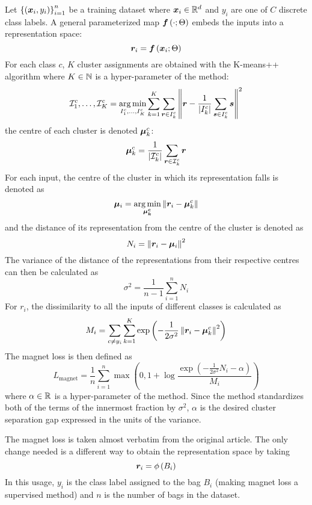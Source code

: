 Let \( \left\{ \left( \bm{x}_i, y_i \right) \right\}_{i = 1}^n \) be a training dataset where \( \bm{x}_i \in \mathbb{R}^d \) and \( y_i \) are one of \( C \) discrete class labels. A general parameterized map \( \bm{f} \left( \cdot; \Theta \right) \) embeds the inputs into a representation space:
\[ \bm{r}_i = \bm{f} \left( \bm{x}_i; \Theta \right) \]
For each class \( c \), \( K \) cluster assignments are obtained with the K-means++ algorithm \cite{macqueen_methods_1967, arthur_k-means++:_2006} where \( K \in \mathbb{N} \) is a hyper-parameter of the method:
\[ \mathcal{I}_1^c, \dots, \mathcal{I}_K^c = \operatorname*{arg\,min}_{I_1^c, \dots, I_K^c} \sum_{k = 1}^K \sum_{\bm{r} \in I_k^c} \left\lVert \bm{r} - \frac{1}{\left\lvert I_k^c \right\rvert} \sum_{\bm{s} \in I_k^c} \bm{s} \right\rVert^2 \]
the centre of each cluster is denoted \( \bm{\mu}_k^c \):
\[ \bm{\mu}_k^c = \frac{1}{\left\lvert \mathcal{I}_k^c \right\rvert} \sum_{\bm{r} \in \mathcal{I}_k^c} \bm{r} \]
For each input, the centre of the cluster in which its representation falls is denoted as
\[ \bm{\mu}_i = \operatorname*{arg\,min}_{\bm{\mu_k^c}} \left\lVert \bm{r}_i - \bm{\mu}_k^c \right\rVert \]
and the distance of its representation from the centre of the cluster is denoted as
\[ N_i = \left\lVert \bm{r}_i - \bm{\mu}_i \right\rVert^2 \]
The variance of the distance of the representations from their respective centres can then be calculated as
\[ \sigma^2 = \frac{1}{n - 1} \sum_{i = 1}^n N_i \]
For \( r_i \), the dissimilarity to all the inputs of different classes is calculated as
\[ M_i = \sum_{c \neq y_i} \sum_{k = 1}^K \exp \left( - \frac{1}{2 \sigma^2} \left\lVert \bm{r}_i - \bm{\mu}_k^c \right\rVert^2 \right) \]
The magnet loss is then defined as
\[ L_\mathrm{magnet} = \frac{1}{n} \sum_{i = 1}^n \max \left( 0, 1 + \log \frac{\exp \left( - \frac{1}{2 \sigma^2} N_i - \alpha \right)}{M_i} \right) \]
where \( \alpha \in \mathbb{R} \) is a hyper-parameter of the method. Since the method standardizes both of the terms of the innermost fraction by \( \sigma^2 \), \( \alpha \) is the desired cluster separation gap expressed in the units of the variance.

The magnet loss is taken almost verbatim from the original article. The only change needed is a different way to obtain the representation space by taking
\[ \bm{r}_i = \phi \left( B_i \right) \]
In this usage, \( y_i \) is the class label assigned to the bag \( B_i \) (making magnet loss a supervised method) and \( n \) is the number of bags in the dataset.

